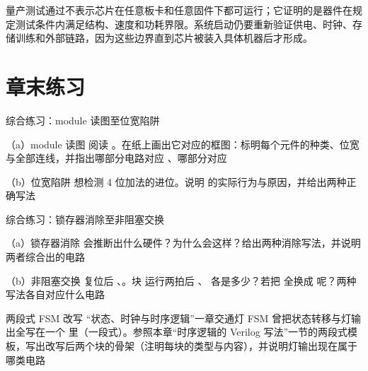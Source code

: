量产测试通过不表示芯片在任意板卡和任意固件下都可运行；它证明的是器件在规定测试条件内满足结构、速度和功耗界限。系统启动仍要重新验证供电、时钟、存储训练和外部链路，因为这些边界直到芯片被装入具体机器后才形成。

\section*{章末练习}

\begin{chapterexercise}{综合练习：module 读图至位宽陷阱}
\begin{exercisesubproblem}{（a）module 读图}
阅读 。在纸上画出它对应的框图：标明每个元件的种类、位宽与全部连线，并指出哪部分电路对应 、哪部分对应 
\end{exercisesubproblem}
\begin{exercisesubproblem}{（b）位宽陷阱}
 想检测 4 位加法的进位。说明  的实际行为与原因，并给出两种正确写法
\end{exercisesubproblem}
\end{chapterexercise}

\begin{chapterexercise}{综合练习：锁存器消除至非阻塞交换}
\begin{exercisesubproblem}{（a）锁存器消除}
 会推断出什么硬件？为什么会这样？给出两种消除写法，并说明两者综合出的电路
\end{exercisesubproblem}
\begin{exercisesubproblem}{（b）非阻塞交换}
复位后 、。块  运行两拍后 、 各是多少？若把 \code{<=} 全换成 \code{=} 呢？两种写法各自对应什么电路
\end{exercisesubproblem}
\end{chapterexercise}

\begin{chapterexercise}{两段式 FSM 改写}
“状态、时钟与时序逻辑”一章交通灯 FSM 曾把状态转移与灯输出全写在一个  里（一段式）。参照本章“时序逻辑的 Verilog 写法”一节的两段式模板，写出改写后两个块的骨架（注明每块的类型与内容），并说明灯输出现在属于哪类电路
\end{chapterexercise}


